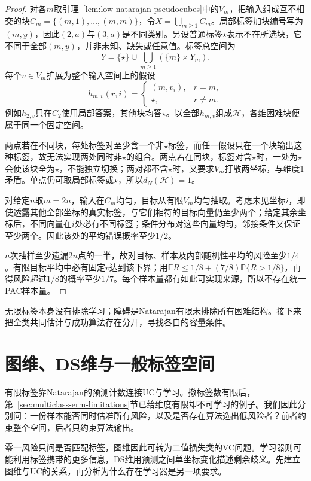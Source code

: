 \begin{proof}
对各$m$取引理~\ref{lem:low-natarajan-pseudocubes}中的$V_m$，把输入组成互不相交的块$C_m=\{(m,1),\ldots,(m,m)\}$，令$X=\bigcup_{m\geq1}C_m$。局部标签加块编号写为$(m,y)$，因此$(2,a)$与$(3,a)$是不同类别。另设普通标签$\star$表示不在所选块，它不同于全部$(m,y)$，并非未知、缺失或任意值。标签总空间为
\[
 Y=\{\star\}\cup\bigcup_{m\geq1}(\{m\}\times Y_m).
\]
每个$v\in V_m$扩展为整个输入空间上的假设
\[
 h_{m,v}(r,i)=
 \begin{cases}
 (m,v_i),&r=m,\\
 \star,&r\neq m.
 \end{cases}
\]
例如$h_{2,v}$只在$C_2$使用局部答案，其他块均答$\star$。以全部$h_{m,v}$组成$\mathcal H$，各维困难块便属于同一个固定空间。

两点若在不同块，每处标签对至少含一个非$\star$标签，而任一假设只在一个块输出这种标签，故无法实现两处同时非$\star$的组合。两点若在同块，标签对含$\star$时，一处为$\star$会使该块全为$\star$，不能独立切换；两对都不含$\star$时，又要求$V_m$打散两坐标，与维度1矛盾。单点仍可取局部标签或$\star$，所以$d_N(\mathcal H)=1$。

对给定$n$取$m=2n$，输入在$C_m$均匀，目标从有限$V_m$均匀抽取。考虑未见坐标$i$，即使透露其他全部坐标的真实标签，与它们相符的目标向量仍至少两个；给定其余坐标后，不同向量在$i$处必有不同标签；条件分布对这些向量均匀，邻接条件又保证至少两个。因此该处的平均错误概率至少$1/2$。

$n$次抽样至少遗漏$2n$点的一半，故对目标、样本及内部随机性平均的风险至少$1/4$。有限目标平均中必有固定$v$达到该下界；用$\mathbb E R\leq1/8+(7/8)\mathbb P\{R>1/8\}$，再得风险超过$1/8$的概率至少$1/7$。每个样本量都有如此可实现来源，所以不存在统一PAC样本量。
\end{proof}

无限标签本身没有排除学习；障碍是Natarajan有限未排除所有困难结构。接下来把全类共同估计与成功算法存在分开，寻找各自的容量条件。

\section{图维、DS维与一般标签空间}
\label{sec:general-multiclass-dimensions}
\label{sec:multiclass-sample-complexity}
有限标签靠Natarajan的预测计数连接UC与学习。撤标签数有限后，第~\ref{sec:multiclass-erm-limitations}节已给维度有限却不可学习的例子。我们因此分别问：一份样本能否同时估准所有风险，以及是否存在算法选出低风险者？前者约束整个空间，后者只约束算法输出。

零一风险只问是否匹配标签，图维因此可转为二值损失类的VC问题。学习器则可能利用标签携带的更多信息，DS维用预测之间单坐标变化描述剩余歧义。先建立图维与UC的关系，再分析为什么存在学习器是另一项要求。

